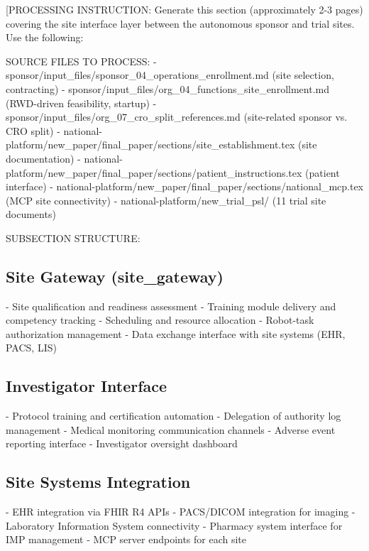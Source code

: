 
[PROCESSING INSTRUCTION: Generate this section (approximately 2-3 pages) covering the
site interface layer between the autonomous sponsor and trial sites. Use the following:

SOURCE FILES TO PROCESS:
- sponsor/input\_files/sponsor\_04\_operations\_enrollment.md (site selection, contracting)
- sponsor/input\_files/org\_04\_functions\_site\_enrollment.md (RWD-driven feasibility, startup)
- sponsor/input\_files/org\_07\_cro\_split\_references.md (site-related sponsor vs. CRO split)
- national-platform/new\_paper/final\_paper/sections/site\_establishment.tex (site documentation)
- national-platform/new\_paper/final\_paper/sections/patient\_instructions.tex (patient interface)
- national-platform/new\_paper/final\_paper/sections/national\_mcp.tex (MCP site connectivity)
- national-platform/new\_trial\_psl/ (11 trial site documents)

SUBSECTION STRUCTURE:

\subsection{Site Gateway (site\_gateway)}
- Site qualification and readiness assessment
- Training module delivery and competency tracking
- Scheduling and resource allocation
- Robot-task authorization management
- Data exchange interface with site systems (EHR, PACS, LIS)

\subsection{Investigator Interface}
- Protocol training and certification automation
- Delegation of authority log management
- Medical monitoring communication channels
- Adverse event reporting interface
- Investigator oversight dashboard

\subsection{Site Systems Integration}
- EHR integration via FHIR R4 APIs
- PACS/DICOM integration for imaging
- Laboratory Information System connectivity
- Pharmacy system interface for IMP management
- MCP server endpoints for each site

